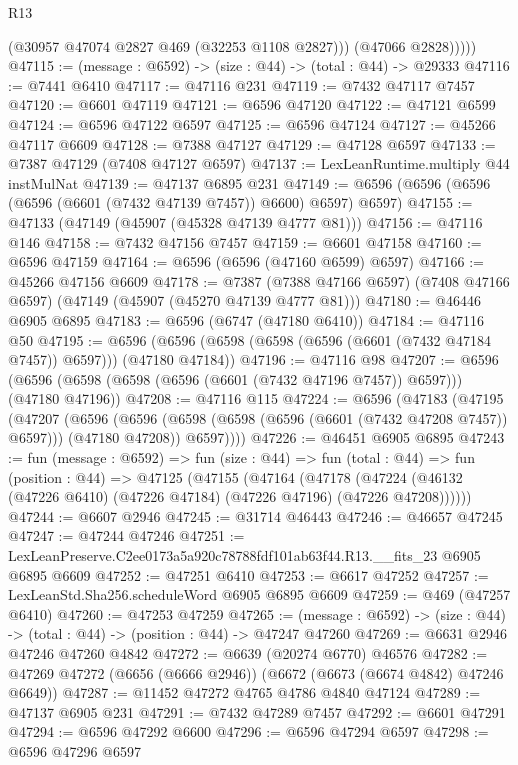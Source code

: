 \begin{lexlean}{R13}
\begin{coremodule}
              (@30957 @47074 @2827 @469 (@32253 @1108 @2827)))
            (@47066 @2828)))))
@47115 := (message : @6592) -> (size : @44) -> (total : @44) -> @29333
@47116 := @7441 @6410
@47117 := @47116 @231
@47119 := @7432 @47117 @7457
@47120 := @6601 @47119
@47121 := @6596 @47120
@47122 := @47121 @6599
@47124 := @6596 @47122 @6597
@47125 := @6596 @47124
@47127 := @45266 @47117 @6609
@47128 := @7388 @47127
@47129 := @47128 @6597
@47133 := @7387 @47129 (@7408 @47127 @6597)
@47137 := LexLeanRuntime.multiply @44 instMulNat
@47139 := @47137 @6895 @231
@47149 := @6596 (@6596 (@6596 (@6596 (@6601 (@7432 @47139 @7457)) @6600) @6597) @6597)
@47155 := @47133 (@47149 (@45907 (@45328 @47139 @4777 @81)))
@47156 := @47116 @146
@47158 := @7432 @47156 @7457
@47159 := @6601 @47158
@47160 := @6596 @47159
@47164 := @6596 (@6596 (@47160 @6599) @6597)
@47166 := @45266 @47156 @6609
@47178 := @7387
    (@7388 @47166 @6597)
    (@7408 @47166 @6597)
    (@47149 (@45907 (@45270 @47139 @4777 @81)))
@47180 := @46446 @6905 @6895
@47183 := @6596 (@6747 (@47180 @6410))
@47184 := @47116 @50
@47195 := @6596 (@6596 (@6598 (@6598 (@6596 (@6601 (@7432 @47184 @7457)) @6597))) (@47180 @47184))
@47196 := @47116 @98
@47207 := @6596 (@6596 (@6598 (@6598 (@6596 (@6601 (@7432 @47196 @7457)) @6597))) (@47180 @47196))
@47208 := @47116 @115
@47224 := @6596
    (@47183
      (@47195
        (@47207
          (@6596
            (@6596 (@6598 (@6598 (@6596 (@6601 (@7432 @47208 @7457)) @6597))) (@47180 @47208))
            @6597))))
@47226 := @46451 @6905 @6895
@47243 := fun (message : @6592) =>
  fun (size : @44) =>
  fun (total : @44) =>
  fun (position : @44) =>
  @47125
    (@47155
      (@47164
        (@47178 (@47224 (@46132 (@47226 @6410) (@47226 @47184) (@47226 @47196) (@47226 @47208))))))
@47244 := @6607 @2946
@47245 := @31714 @46443
@47246 := @46657 @47245
@47247 := @47244 @47246
@47251 := LexLeanPreserve.C2ee0173a5a920c78788fdf101ab63f44.R13.__fits_23 @6905 @6895 @6609
@47252 := @47251 @6410
@47253 := @6617 @47252
@47257 := LexLeanStd.Sha256.scheduleWord @6905 @6895 @6609
@47259 := @469 (@47257 @6410)
@47260 := @47253 @47259
@47265 := (message : @6592) -> (size : @44) -> (total : @44) -> (position : @44) -> @47247 @47260
@47269 := @6631 @2946 @47246 @47260 @4842
@47272 := @6639 (@20274 @6770) @46576
@47282 := @47269 @47272 (@6656 (@6666 @2946)) (@6672 (@6673 (@6674 @4842) @47246 @6649))
@47287 := @11452 @47272 @4765 @4786 @4840 @47124
@47289 := @47137 @6905 @231
@47291 := @7432 @47289 @7457
@47292 := @6601 @47291
@47294 := @6596 @47292 @6600
@47296 := @6596 @47294 @6597
@47298 := @6596 @47296 @6597

\end{coremodule}
\end{lexlean}
